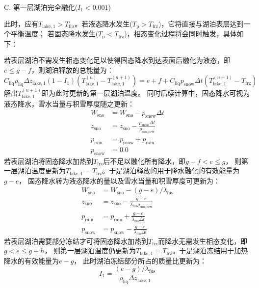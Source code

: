C. 	第一层湖泊完全融化($I_1<0.001$)

此时，应有$T_{\mathrm{lake,1}}>T_{\mathrm {frz}} $。若液态降水发生($T_{\mathrm {p}} >T_{\mathrm {frz}} $)，它将直接与湖泊表层达到一个平衡温度；
若固态降水发生($T_{\mathrm {p}} <T_{\mathrm {frz}} $)，相态变化过程将会同时触发，具体如下：

若表层湖泊不需发生相态变化足以使得固态降水到达表面后融化为液态，即$e\leqslant g-f$，则湖泊释放的总能量为：
\begin{equation}
  C_{\mathrm{liq}} \rho_{\mathrm{liq}} \Delta z_{\mathrm{lake, 1}}\left(1-I_{1}\right)\left(T_{\mathrm{lake, 1}}^{(n)}-T_{\mathrm{lake, 1}}^{(n+1)}\right)=
  e+f+C_{\mathrm{liq}} p_{\mathrm {snow}} \Delta t\left(T_{\mathrm{lake, 1}}^{(n+1)}-T_{\mathrm {frz}}\right)
\end{equation}
解出$T_{\mathrm{lake,1}}^{\left(n+1\right)}$即为此时更新的第一层湖泊温度。
同时后续计算中，固态降水可视为液态降水，雪水当量与积雪厚度随之更新：
\begin{equation}
  \begin{aligned}
    W_{\mathrm{sno}} &= W_{\mathrm{sno}}-p_{\mathrm {snow}} \Delta t \\
    z_{\mathrm{sno}} &= z_{\mathrm{sno}}-\frac{p_{\mathrm {snow}}  \Delta t}{\rho_{\mathrm{sno,new}}} \\
    p_{\mathrm {rain}}  &= p_{\mathrm {snow}}  + p_{\mathrm {rain}}  \\
    p_{\mathrm {snow}}  &= 0.0
  \end{aligned}
\end{equation}
若表层湖泊将固态降水加热到$T_{\mathrm {frz}} $后不足以融化所有降水，即$g-f<e\leqslant g$，
则第一层湖泊温度更新为$T_{\mathrm{lake,1}}=T_{\mathrm {frz}} $。于是湖泊释放的用于降水融化的有效能量为$g-e$，
固态降水转为液态降水的量以及雪水当量和积雪厚度可更新为：
\begin{equation}
  \begin{aligned}
    W_{\mathrm{sno}} &= W_{\mathrm{sno}}-(g-e) / \lambda_{\mathrm {fus}} \\
    z_{\mathrm{sno}} &= z_{\mathrm{sno}}-\frac{g-e}{\lambda_{\mathrm {fus}}  \rho_{\mathrm{sno,new}}} \\
    p_{\mathrm {rain}} &= p_{\mathrm {rain}}+\frac{g-e}{\lambda_{\mathrm {fus}}  \Delta t} \\
    p_{\mathrm {snow}} &= p_{\mathrm {snow}}-\frac{g-e}{\lambda_{\mathrm {fus}}  \Delta t}
  \end{aligned}
\end{equation}
若表层湖泊需要部分冻结才可将固态降水加热到$T_{\mathrm {frz}} $而降水无需发生相态变化，即$g<e\leqslant g+h$，
则第一层湖泊温度仍更新为$T_{\mathrm{lake,1}}=T_{\mathrm {frz}} $。于是湖泊冻结用于加热降水的有效能量为$e-g$，
此时湖泊冻结部分所占的质量比更新为：
\begin{equation}
  I_{1}=\frac{(e-g) / \lambda_{\mathrm {fus}}}{\rho_{\mathrm{liq}} \Delta z_{\mathrm{lake, 1}}}
\end{equation}

